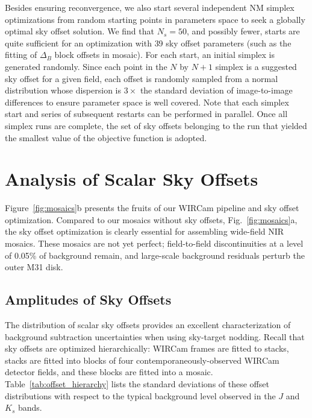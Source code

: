 \documentclass[iop,tighten]{emulateapj}
\newcommand{\Fig}[1]{Fig.~\ref{fig:#1}}  %
\newcommand{\Tab}[1]{Table~\ref{tab:#1}}  %
\begin{document}
Besides ensuring reconvergence, we also start several independent NM simplex optimizations from random starting points in parameters space to seek a globally optimal sky offset solution.
We find that $N_s=50$, and possibly fewer, starts are quite sufficient for an optimization with 39 sky offset parameters (such as the fitting of $\Delta_B$ block offsets in mosaic).
For each start, an initial simplex is generated randomly.
Since each point in the $N$ by $N+1$ simplex is a suggested sky offset for a given field, each offset is randomly sampled from a normal distribution whose dispersion is $3\times$ the standard deviation of image-to-image differences to ensure parameter space is well covered.
Note that each simplex start and series of subsequent restarts can be performed in parallel.
Once all simplex runs are complete, the set of sky offsets belonging to the run that yielded the smallest value of the objective function is adopted.

\section{Analysis of Scalar Sky Offsets}
\label{sec:scalaranalysis}

Figure~\ref{fig:mosaics}b presents the fruits of our WIRCam pipeline and sky offset optimization.
Compared to our mosaics without sky offsets, \Fig{mosaics}a, the sky offset optimization is clearly essential for assembling wide-field NIR mosaics.
These mosaics are not yet perfect; field-to-field discontinuities at a level of 0.05\% of background remain, and large-scale background residuals perturb the outer M31 disk.


\subsection{Amplitudes of Sky Offsets}
\label{sec:offset_amplitudes}

The distribution of scalar sky offsets provides an excellent characterization of background subtraction uncertainties when using sky-target nodding.
Recall that sky offsets are optimized hierarchically: WIRCam frames are fitted to stacks, stacks are fitted into blocks of four contemporaneously-observed WIRCam detector fields, and these blocks are fitted into a mosaic.
\Tab{offset_hierarchy} lists the standard deviations of these offset distributions with respect to the typical background level observed in the $J$ and $K_s$ bands.
\end{document}
